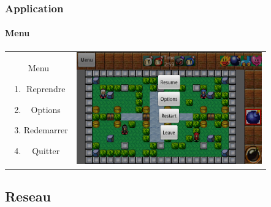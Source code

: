 	\begin{frame}
	\frametitle{Application}
	\framesubtitle{Menu}
	
			\begin{tabular}{cc}
			\begin{minipage}{3cm}
				Menu
				\begin{enumerate}
					\item Reprendre
					\item Options
					\item Redemarrer
					\item Quitter
				\end{enumerate}
			\end{minipage} &
			\begin{minipage}{8cm}
				\includegraphics[width=8cm]{img/menusolo.png} 
			\end{minipage}\\
		\end{tabular}
	
	\end{frame}

\subsection{Reseau}

